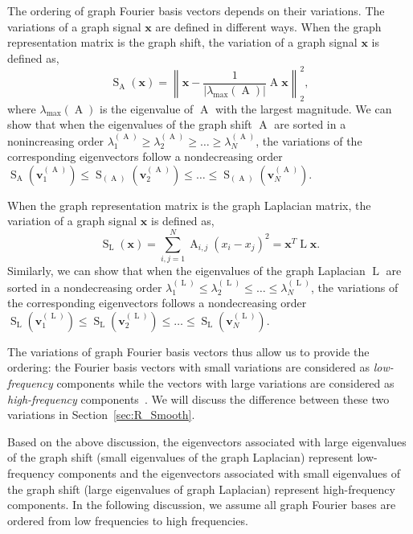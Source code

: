 \documentclass[journal,twocolumn,10pt]{IEEEtran}
\theoremstyle{definition}
\def\x{\mathbf{x}}
\def\vv{\mathbf{v}}
\DeclareMathOperator{\LL}{L}
\DeclareMathOperator{\STV}{S}
\DeclareMathOperator{\Adj}{A}
\begin{document}
The ordering of graph Fourier basis vectors depends on their variations. The variations of a graph signal $\x$ are defined in different ways. When the graph representation matrix is the graph shift, the variation of a graph signal $\x$ is defined as,
\begin{equation*} 	\STV_{\Adj} ( \x ) = \left\| \x - \frac{1}{\left\lvert\lambda_{\max}(\Adj)\right\rvert} \Adj \x \right\|_2^2, \end{equation*}
 where $\lambda_{\max}(\Adj)$ is the eigenvalue of $\Adj$ with the largest magnitude. We can show that when the eigenvalues of the graph shift $\Adj $ are sorted in a nonincreasing order $\lambda^{(\Adj)}_1 \geq \lambda^{(\Adj)}_2 \geq \ldots \geq \lambda^{(\Adj)}_N$, the variations of the corresponding eigenvectors follow a nondecreasing order $\STV_{\Adj}(\vv^{(\Adj)}_1) \leq \STV_{(\Adj)}(\vv^{(\Adj)}_2) \leq \ldots \leq \STV_{(\Adj)}(\vv^{(\Adj)}_N)$.


 When the graph representation matrix is the graph Laplacian matrix, the variation of a graph signal $\x$ is defined as,
 \begin{equation*} 	\STV_{\LL} (\x) = \sum_{i,j=1}^N \Adj_{i,j}(x_i-x_j)^2 = \x^T \LL \x. \end{equation*}
Similarly, we can show that when the eigenvalues of the graph Laplacian $\LL$ are sorted in a nondecreasing order $\lambda^{(\LL)}_1 \leq \lambda^{(\LL)}_2 \leq \ldots \leq \lambda^{(\LL)}_N$, the variations of the corresponding eigenvectors follows a nondecreasing order $\STV_{\LL}(\vv^{(\LL)}_1) \leq \STV_{\LL}(\vv^{(\LL)}_2) \leq \ldots \leq \STV_{\LL}(\vv^{(\LL)}_N)$. 


 The variations of graph Fourier basis vectors thus allow us to provide the ordering:  the Fourier basis vectors with small variations are considered as \textit{low-frequency} components while the vectors with large variations are considered as \textit{high-frequency} components~\cite{SandryhailaM:131}. We will discuss the difference between these two variations in Section~\ref{sec:R_Smooth}.

 Based on the above discussion, the eigenvectors associated with large eigenvalues of the graph shift  (small eigenvalues of the graph Laplacian) represent low-frequency components and the eigenvectors associated with small eigenvalues of the graph shift (large eigenvalues of graph Laplacian) represent high-frequency components. In the following discussion, we assume all graph Fourier bases are ordered from low frequencies to high frequencies.
\end{document}
